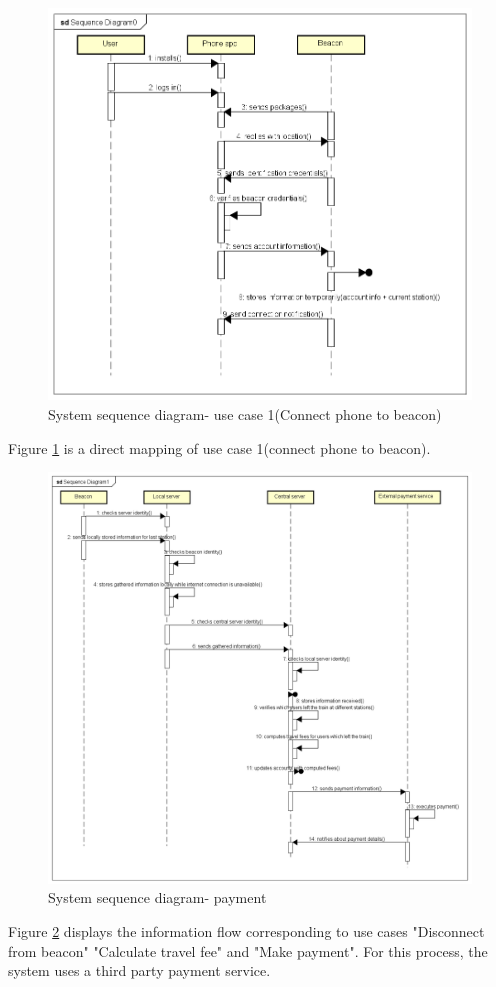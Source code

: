 \begin{figure}[H]
	\centering
	\includegraphics[width=\textwidth]{Pictures/seq_diagram_uc1.png}
	\caption{System sequence diagram- use case 1(Connect phone to beacon)}
	\label{fig:seqDiagram1}
\end{figure}
Figure \ref{fig:seqDiagram1} is a direct mapping of use case 1(connect phone to beacon).

\begin{figure}[H]
	\centering
	\includegraphics[width=\textwidth]{Pictures/seq_diagram_payment.png}
	\caption{System sequence diagram- payment}
	\label{fig:seqDiagram2}
\end{figure}
Figure \ref{fig:seqDiagram2} displays the information flow corresponding to use cases "Disconnect from beacon" "Calculate travel fee" and "Make payment". For this process, the system uses a third party payment service.

